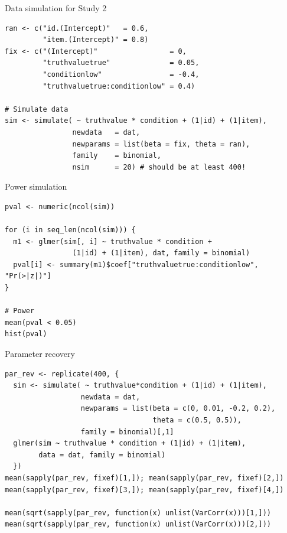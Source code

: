 \documentclass[aspectratio=169]{beamer}
\begin{document}
{


\begin{frame}[fragile]{Data simulation for Study 2}
\begin{lstlisting}
ran <- c("id.(Intercept)"   = 0.6,
         "item.(Intercept)" = 0.8)
fix <- c("(Intercept)"                 = 0, 
         "truthvaluetrue"              = 0.05,
         "conditionlow"                = -0.4,
         "truthvaluetrue:conditionlow" = 0.4)

# Simulate data
sim <- simulate( ~ truthvalue * condition + (1|id) + (1|item),
                newdata   = dat,
                newparams = list(beta = fix, theta = ran),
                family    = binomial,
                nsim      = 20) # should be at least 400!
\end{lstlisting}
\end{frame}


\begin{frame}[fragile]{Power simulation}
\begin{lstlisting}
pval <- numeric(ncol(sim))

for (i in seq_len(ncol(sim))) {
  m1 <- glmer(sim[, i] ~ truthvalue * condition + 
                (1|id) + (1|item), dat, family = binomial)
  pval[i] <- summary(m1)$coef["truthvaluetrue:conditionlow", "Pr(>|z|)"]
}

# Power
mean(pval < 0.05)
hist(pval)
\end{lstlisting}
\end{frame}

\begin{frame}[fragile]{Parameter recovery}
\begin{lstlisting}
par_rev <- replicate(400, {
  sim <- simulate( ~ truthvalue*condition + (1|id) + (1|item),
                  newdata = dat,
                  newparams = list(beta = c(0, 0.01, -0.2, 0.2),
                                   theta = c(0.5, 0.5)),
                  family = binomial)[,1]
  glmer(sim ~ truthvalue * condition + (1|id) + (1|item), 
        data = dat, family = binomial)
  })
mean(sapply(par_rev, fixef)[1,]); mean(sapply(par_rev, fixef)[2,])
mean(sapply(par_rev, fixef)[3,]); mean(sapply(par_rev, fixef)[4,])

mean(sqrt(sapply(par_rev, function(x) unlist(VarCorr(x)))[1,]))
mean(sqrt(sapply(par_rev, function(x) unlist(VarCorr(x)))[2,]))
\end{lstlisting}
\end{frame}

}
 
\end{document}
